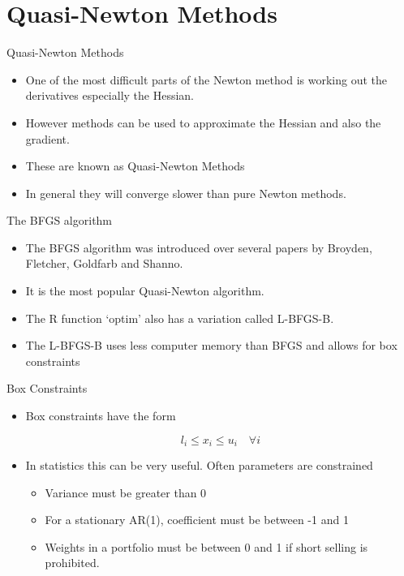 \documentclass[10pt]{beamer}
\begin{document}
\section{Quasi-Newton Methods}
\begin{frame}{Quasi-Newton Methods}
  \begin{itemize}
  \item One of the most difficult parts of the Newton method is working out the derivatives especially the Hessian.

  \item However methods can be used to approximate the Hessian and also the gradient.

  \item These are known as Quasi-Newton Methods

  \item In general they will converge slower than pure Newton methods.
  \end{itemize}
\end{frame}
\begin{frame}{The BFGS algorithm}
  \begin{itemize}
  \item The BFGS algorithm was introduced over several papers by Broyden, Fletcher, Goldfarb and Shanno.

  \item It is the most popular Quasi-Newton algorithm.

  \item The R function `optim' also has a variation called L-BFGS-B.
  \item The L-BFGS-B uses less computer memory than BFGS and allows for box constraints
  \end{itemize}
\end{frame}
\begin{frame}{Box Constraints}
  \begin{itemize}
  \item Box constraints have the form

    \begin{equation}
      l_i\leq x_i \leq u_i\quad\forall i
    \end{equation}

  \item In statistics this can be very useful.  Often parameters are constrained
    \begin{itemize}
    \item Variance must be greater than 0
    \item For a stationary AR(1), coefficient must be between -1 and 1
    \item Weights in a portfolio must be between 0 and 1 if short selling is prohibited.
    \end{itemize}
  \end{itemize}
\end{frame}
\end{document}
